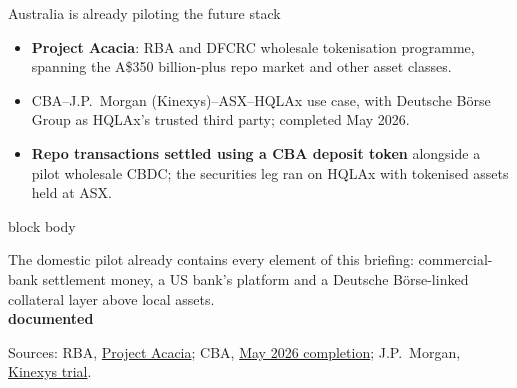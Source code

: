 \documentclass[aspectratio=169,12pt]{beamer}
\newcommand{\rust}[1]{\textcolor{Rust}{\textbf{#1}}}
\newcommand{\source}[1]{\vfill\par\fontsize{5.4}{6.5}\selectfont\color{Quiet}Sources: #1}
\newcommand{\tightitems}{\setlength{\itemsep}{0.42em}\setlength{\parskip}{0pt}}
\newcommand{\tdoc}{\textcolor{Sage}{\bfseries documented}}
\newenvironment{statement}{%
  \begin{beamercolorbox}[sep=.18cm,rounded=false,wd=\linewidth]{block body}%
  \fontsize{13}{15.5}\selectfont\bfseries
}{\end{beamercolorbox}}
\begin{document}
\begin{frame}{Australia is already piloting the future stack}
  \begin{itemize}\tightitems
    \item \rust{Project Acacia}: RBA and DFCRC wholesale tokenisation programme, spanning the A\$350 billion-plus repo market and other asset classes.
    \item CBA--J.P.\ Morgan (Kinexys)--ASX--HQLAx use case, with Deutsche B\"orse Group as HQLAx's trusted third party; completed May 2026.
    \item \rust{Repo transactions settled using a CBA deposit token} alongside a pilot wholesale CBDC; the securities leg ran on HQLAx with tokenised assets held at ASX.
  \end{itemize}
  \vspace{0.24cm}
  \begin{statement}
    The domestic pilot already contains every element of this briefing: commercial-bank settlement money, a US bank's platform and a Deutsche B\"orse-linked collateral layer above local assets.\\\hspace*{\fill}\tdoc
  \end{statement}
  \source{RBA, \href{https://www.rba.gov.au/media-releases/2024/mr-24-25.html}{Project Acacia}; CBA, \href{https://www.commbank.com.au/articles/newsroom/2026/05/rba-wholesale-funding-markets-trial.html}{May 2026 completion}; J.P.\ Morgan, \href{https://www.jpmorgan.com/payments/newsroom/kinexys-project-acacia-tokenization-trial-australia}{Kinexys trial}.}
\end{frame}
\end{document}
